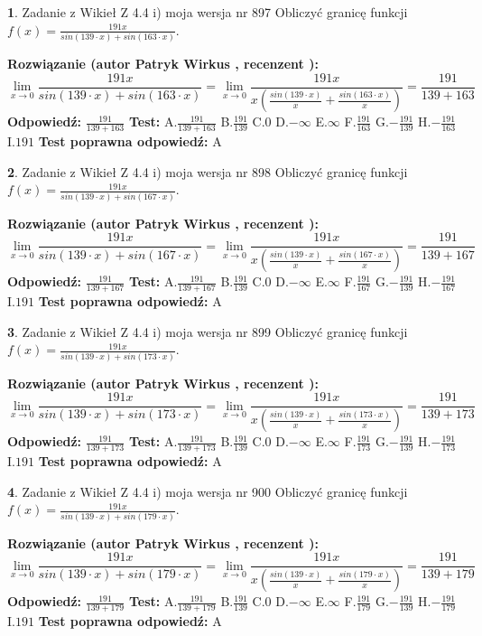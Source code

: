\documentclass[12pt, a4paper]{article}
\theoremstyle{definition} %
\newtheorem{zad}{}
\newcommand{\zadStart}[1]{\begin{zad}#1\newline}
\newcommand{\zadStop}{\end{zad}}
\newcommand{\rozwStart}[2]{\noindent \textbf{Rozwiązanie (autor #1 , recenzent #2): }\newline}
\newcommand{\rozwStop}{\newline}
\newcommand{\odpStart}{\noindent \textbf{Odpowiedź:}\newline}
\newcommand{\odpStop}{\newline}
\newcommand{\testStart}{\noindent \textbf{Test:}\newline}
\newcommand{\testStop}{\newline}
\newcommand{\kluczStart}{\noindent \textbf{Test poprawna odpowiedź:}\newline}
\newcommand{\kluczStop}{\newline}
\begin{document}
\zadStart{Zadanie z Wikieł Z 4.4 i) moja wersja nr 897}
Obliczyć granicę funkcji $f(x)=\frac{191x}{sin(139\cdot x) +sin(163\cdot x)}$.
\zadStop
\rozwStart{Patryk Wirkus}{}
$$\lim\limits_{x\to 0}\frac{191x}{sin(139\cdot x) +sin(163\cdot x)}=\lim\limits_{x\to 0}\frac{191x}{x(\frac{sin(139\cdot x)}{x}+\frac{sin(163\cdot x)}{x})}=\frac{191}{139+163}$$
\rozwStop
\odpStart
$\frac{191}{139+163}$
\odpStop
\testStart
A.$\frac{191}{139+163}$
B.$\frac{191}{139}$
C.$0$
D.$-\infty$
E.$\infty$
F.$\frac{191}{163}$
G.$-\frac{191}{139}$
H.$-\frac{191}{163}$
I.$191$
\testStop
\kluczStart
A
\kluczStop



\zadStart{Zadanie z Wikieł Z 4.4 i) moja wersja nr 898}
Obliczyć granicę funkcji $f(x)=\frac{191x}{sin(139\cdot x) +sin(167\cdot x)}$.
\zadStop
\rozwStart{Patryk Wirkus}{}
$$\lim\limits_{x\to 0}\frac{191x}{sin(139\cdot x) +sin(167\cdot x)}=\lim\limits_{x\to 0}\frac{191x}{x(\frac{sin(139\cdot x)}{x}+\frac{sin(167\cdot x)}{x})}=\frac{191}{139+167}$$
\rozwStop
\odpStart
$\frac{191}{139+167}$
\odpStop
\testStart
A.$\frac{191}{139+167}$
B.$\frac{191}{139}$
C.$0$
D.$-\infty$
E.$\infty$
F.$\frac{191}{167}$
G.$-\frac{191}{139}$
H.$-\frac{191}{167}$
I.$191$
\testStop
\kluczStart
A
\kluczStop



\zadStart{Zadanie z Wikieł Z 4.4 i) moja wersja nr 899}
Obliczyć granicę funkcji $f(x)=\frac{191x}{sin(139\cdot x) +sin(173\cdot x)}$.
\zadStop
\rozwStart{Patryk Wirkus}{}
$$\lim\limits_{x\to 0}\frac{191x}{sin(139\cdot x) +sin(173\cdot x)}=\lim\limits_{x\to 0}\frac{191x}{x(\frac{sin(139\cdot x)}{x}+\frac{sin(173\cdot x)}{x})}=\frac{191}{139+173}$$
\rozwStop
\odpStart
$\frac{191}{139+173}$
\odpStop
\testStart
A.$\frac{191}{139+173}$
B.$\frac{191}{139}$
C.$0$
D.$-\infty$
E.$\infty$
F.$\frac{191}{173}$
G.$-\frac{191}{139}$
H.$-\frac{191}{173}$
I.$191$
\testStop
\kluczStart
A
\kluczStop



\zadStart{Zadanie z Wikieł Z 4.4 i) moja wersja nr 900}
Obliczyć granicę funkcji $f(x)=\frac{191x}{sin(139\cdot x) +sin(179\cdot x)}$.
\zadStop
\rozwStart{Patryk Wirkus}{}
$$\lim\limits_{x\to 0}\frac{191x}{sin(139\cdot x) +sin(179\cdot x)}=\lim\limits_{x\to 0}\frac{191x}{x(\frac{sin(139\cdot x)}{x}+\frac{sin(179\cdot x)}{x})}=\frac{191}{139+179}$$
\rozwStop
\odpStart
$\frac{191}{139+179}$
\odpStop
\testStart
A.$\frac{191}{139+179}$
B.$\frac{191}{139}$
C.$0$
D.$-\infty$
E.$\infty$
F.$\frac{191}{179}$
G.$-\frac{191}{139}$
H.$-\frac{191}{179}$
I.$191$
\testStop
\kluczStart
A
\kluczStop
\end{document}
